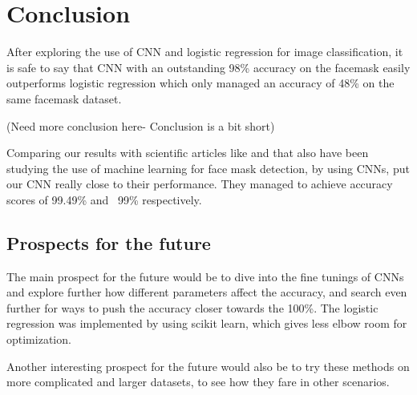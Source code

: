 \documentclass[../main.tex]{subfiles}
\begin{document}
\section{Conclusion}
After exploring the use of CNN and logistic regression for image classification, it is safe to say that CNN with an outstanding 98\% accuracy on the facemask easily outperforms logistic regression which only managed an accuracy of 48\% on the same facemask dataset.

(Need more conclusion here- Conclusion is a bit short)

Comparing our results with scientific articles like \cite{scientific_article_1} and \cite{scientific_article_2} that also have been studying the use of machine learning for face mask detection, by using CNNs, put our CNN really close to their performance. They managed to achieve accuracy scores of 99.49\% and ~99\% respectively.

\subsection{Prospects for the future}
The main prospect for the future would be to dive into the fine tunings of CNNs and explore further how different parameters affect the accuracy, and search even further for ways to push the accuracy closer towards the 100\%. The logistic regression was implemented by using scikit learn, which gives less elbow room for optimization.

Another interesting prospect for the future would also be to try these methods on more complicated and larger datasets, to see how they fare in other scenarios.
\end{document}
